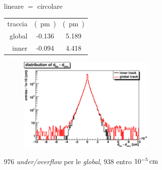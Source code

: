 \documentclass[italian]{beamer}
\begin{document}
\begin{frame}
    {lineare $=$ circolare}
    \begin{table}[h]
        \centering
        \begin{tabular}{rcc}
            traccia & \unit[media]{(pm)}& \unit[RMS]{(pm)}\\
            global & -0.136 & 5.189\\
            inner & -0.094 & 4.418\\
        \end{tabular}
    \end{table}
\begin{figure}[h]
    \includegraphics[width=0.6\textwidth]{crea_istogrammi/lin_circ.eps}
\end{figure}
976 \emph{under/overflow} per le \emph{global}, 938 entro
$\unit[10^{-5}]{cm}$
\end{frame}
\end{document}
